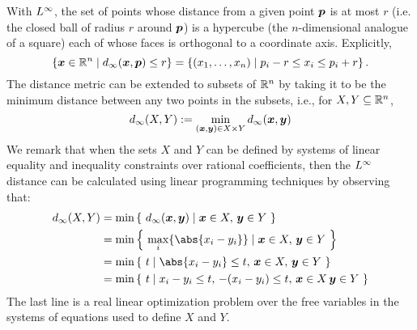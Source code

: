 With $L^\infty$, the set of points whose distance from a given point $\boldsymbol{p}$
is at most $r$ (i.e. the closed ball of radius $r$ around $\boldsymbol{p}$) is a
hypercube (the $n$-dimensional analogue of a square) each of whose faces
is orthogonal to a coordinate axis. Explicitly,
%
\begin{equation}
    \label{eq:linf-sphere}
    \left\{ \boldsymbol{x} \in \mathbb{R}^n \mid d_\infty(\boldsymbol{x}, \boldsymbol{p}) \le r \right\} =
    \left\{ (x_1, \ldots, x_n) \mid p_i-r \le x_i \le p_i+r \right\}.
\end{equation}
%
The distance metric can be extended to subsets of $\mathbb{R}^n$ by taking it to be the
minimum distance between any two points in the subsets, i.e.,
for $X, Y \subseteq \mathbb{R}^n$,
\begin{equation}
 d_\infty(X, Y) := \min_{(\boldsymbol{x},\boldsymbol{y}) \in X{}\times{}Y} d_\infty(\boldsymbol{x},\boldsymbol{y})
\end{equation}
%
We remark that when the sets $X$ and $Y$ can be defined by systems of linear
equality and inequality constraints over rational coefficients, then the
$L^\infty$ distance can be calculated using linear programming techniques by
observing that:
%
\begin{align}
d_\infty(X, Y)
    &= \min \left\{\ d_\infty(\v{x}, \v{y})   \mid \v{x} \in X,\, \v{y} \in Y\ \right\} \\
    &= \min \left\{\ \max_i\{\abs{x_i-y_i}\}  \mid \v{x} \in X,\, \v{y} \in Y\ \right\} \\
    &= \min \left\{\ t \mid \abs{x_i-y_i} \le t,\, \v{x} \in X,\, \v{y} \in Y\ \right\} \\
    &= \min \left\{\ t \mid x_i-y_i \le t,\, -(x_i-y_i) \le t,\, \v{x} \in X\,
      \v{y} \in Y\ \right\}
\label{eq:set_distance}
\end{align}
%
The last line is a real linear optimization problem over the free
variables in the systems of equations used to define $X$ and $Y$.